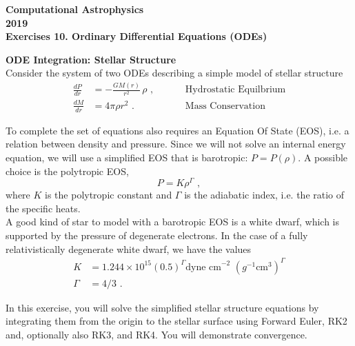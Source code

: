 \documentclass[11pt]{article}
\begin{document}
\begin{center}
\large \bf Computational Astrophysics \rm \\
2019\\
{\small Exercises 10. Ordinary Differential Equations (ODEs)}
\end{center}

 {\bf ODE Integration:  Stellar Structure} \\
 
Consider the system of two ODEs describing a simple model of stellar structure
\begin{align}
\frac{dP}{dr} &= - \frac{GM(r)}{r^2}\, \rho\,\,, &\hspace{1cm}
\text{Hydrostatic Equilbrium}\\
\frac{dM}{dr} &= 4\pi \rho r^2\,\,. &\hspace{1cm} \text{Mass Conservation}
\end{align}

To complete the set of equations also requires an Equation Of State (EOS), i.e. a
relation between density and pressure. Since we will not solve an
internal energy equation, we will use a simplified EOS that is
barotropic: $P=P(\rho)$.  A possible choice is the polytropic EOS,
\begin{equation}
P = K \rho^\Gamma\,\,,
\end{equation}
where $K$ is the polytropic constant and $\Gamma$ is the adiabatic
index, i.e. the ratio of the specific heats. \\
A good kind of star to model
with a barotropic EOS is a white dwarf, which is supported by the
pressure of degenerate electrons.  In the case of a fully
relativistically degenerate white dwarf, we have the values
\begin{equation}
\begin{aligned}
K &= 1.244 \times 10^{15} (0.5)^\Gamma \text{dyne cm}^{-2}\,\, (g^{-1} \mathrm{cm^3})^\Gamma\\
\Gamma &= 4/3\,\,.
\end{aligned}
\end{equation}

In this exercise, you will solve the simplified stellar
structure equations by integrating them from the origin to the stellar
surface using Forward Euler, RK2 and, optionally also RK3, and
RK4. You will demonstrate convergence. 
\end{document}
